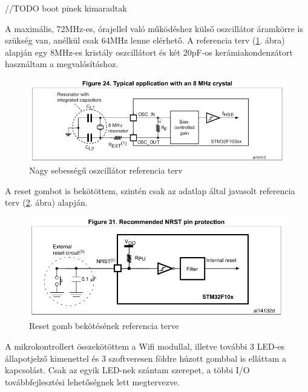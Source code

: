 \documentclass[../main.tex]{subfiles}
\begin{document}
            //TODO boot pinek kimaradtak
            
            A maximális, 72MHz-es, órajellel való működéshez külső oszcillátor áramkörre is szükség van, anélkül csak 64MHz lenne elérhető. A referencia terv (\ref{fig:hse_ref_des}. ábra) alapján egy 8MHz-es kristály oszcillátort és két 20pF-os kerámiakondenzátort használtam a megvalósításhoz. 
            
            \begin{figure}[h!]
                \centering
                    \includegraphics[width=12cm]{resources/pcb_res/hse_ref_des.png}
                \caption{Nagy sebességű oszcillátor referencia terv}
                \label{fig:hse_ref_des}
            \end{figure}
            
            A reset gombot is bekötöttem, szintén csak az adatlap által javasolt referencia terv (\ref{fig:reset_ref_des}. ábra) alapján.
            
            \begin{figure}[h!]
                \centering
                    \includegraphics[width=12cm]{resources/pcb_res/reset_ref_des.png}
                \caption{Reset gomb bekötésének referencia terve}
                \label{fig:reset_ref_des}
            \end{figure}
            
            A mikrokontrollert összekötöttem a Wifi modullal, illetve további 3 LED-es állapotjelző kimenettel és 3 szoftveresen földre húzott gombbal is elláttam a kapcsolást. Csak az egyik LED-nek szántam szerepet, a többi I/O továbbfejlesztési lehetőségnek lett megtervezve.
            
\end{document}
